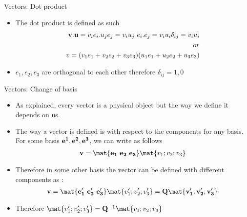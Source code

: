 	\begin{frame}{Vectors: Dot product}
		\begin{itemize}
			\item The dot product is defined as such 
			\begin{equation}
			\begin{aligned}
				\mathbf{v.u} = v_ie_i . u_je_j = v_iu_j~e_i.e_j = v_iu_i \delta_{ij} = v_iu_i \\ or \\
				v = (v_1e_1 + v_2e_2 + v_3e_3)(u_1e_1 + u_2e_2 + u_3e_3)\\
			\end{aligned}
			\end{equation}

			\item $e_1,e_2,e_3$ are orthogonal to each other therefore $\delta_{ij}  = 1,0$ 
		\end{itemize}
	\end{frame}


	\begin{frame}{Vectors: Change of basis}
	\begin{itemize}
		\item As explained, every vector is a physical object but the way we define it depends on us.
		\item The way a vector is defined is with respect to the components for any basis. For some basis $\mathbf{e^1, e^2, e^3}$, we can write as follows
		\begin{align*}
		\ve{v} = \mat{\ve{e_1~e_2~e_3}}\mat{v_1;v_2;v_3} 
		\end{align*}
		\item Therefore in some other basis the vector can be defined with different components as : 
		\begin{align*}
		\ve{v} =\mat{\ve{e'_1~e'_2~e'_3}}\mat{v'_1;v'_2;v'_3} = \ve{Q \mat{v'_1;v'_2;v'_3}}		
		\end{align*}
		\item Therefore $\mat{v'_1;v'_2;v'_3} = \ve{Q^{-1}}\mat{v_1;v_2;v_3}$
		
 
	\end{itemize}
	\end{frame}


